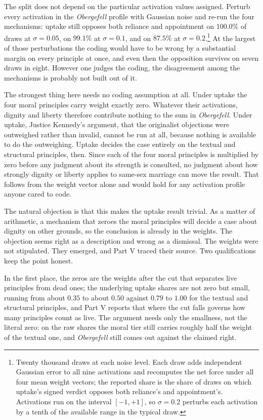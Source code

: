 The split does not depend on the particular activation values assigned. Perturb every activation in the \textit{Obergefell} profile with
Gaussian noise and re-run the four mechanisms: uptake still opposes
both reliance and appointment on $100.0\%$ of draws at $\sigma = 0.05$,
on $99.1\%$ at $\sigma = 0.1$, and on $87.5\%$ at $\sigma =
0.2$.\footnote{Twenty thousand draws at each noise level. Each draw adds
independent Gaussian error to all nine activations and recomputes the
net force under all four mean weight vectors; the reported share is the
share of draws on which uptake's signed verdict opposes both reliance's
and appointment's. Activations run on the interval $[-1,+1]$, so
$\sigma = 0.2$ perturbs each activation by a tenth of the available
range in the typical draw.} At the largest of those perturbations the coding would have to be wrong by
a substantial margin on every principle at once, and even then the
opposition survives on seven draws in eight. However one judges the
coding, the disagreement among the mechanisms is probably not built out of
it.

The strongest thing here needs no coding assumption at all. Under uptake
the four moral principles carry weight exactly zero. Whatever their
activations, dignity and liberty therefore contribute nothing to the sum in
\textit{Obergefell}. Under uptake, Justice Kennedy's argument, that the originalist objections
were outweighed rather than invalid, cannot be run at all, because nothing
is available to do the outweighing. Uptake decides the case entirely on the textual and structural principles,
then.
Since each of the four moral principles is multiplied by zero before any judgment about its strength is consulted, no
judgment about how strongly dignity or liberty applies to same-sex marriage
can move the result. That follows from the weight vector
alone and would hold for any activation profile anyone cared to code.

The natural objection is that this makes the uptake result trivial. As a
matter of arithmetic, a mechanism that zeroes the moral principles will
decide a case about dignity on other grounds, so the conclusion is already
in the weights. The objection seems right as a description and wrong as a
dismissal. The weights were not stipulated. They emerged, and Part V traced their
source. Two qualifications keep the point honest.

In the first place, the zeros are the weights after the cut that separates
live principles from dead ones; the underlying
uptake shares are not zero but small, running from about $0.35$ to about
$0.50$ against $0.79$ to $1.00$ for the textual and structural
principles, and Part V reports that where the cut falls governs how many
principles count as live. The argument needs only the smallness, not the
literal zero: on the raw shares the moral tier still carries roughly
half the weight of the textual one, and \textit{Obergefell} still comes
out against the claimed right.

